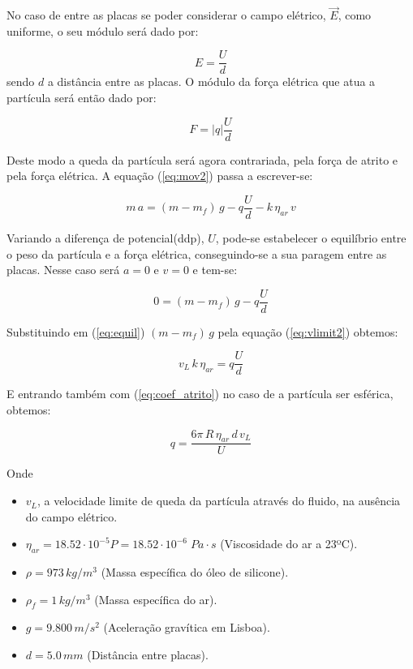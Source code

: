 \documentclass[a4paper,twoside,12pt]{article}      %
\begin{document}
No caso de entre as placas se poder considerar o campo elétrico, $\vec{E}$, como uniforme, o seu módulo será dado por:


\begin{equation*}
	E = \frac{U}{d}
\end{equation*}
sendo $d$ a distância entre as placas. O módulo da força elétrica que atua a partícula será então  dado por: 

\begin{equation*}
	F = |q| \frac{U}{d}
\end{equation*}

Deste modo a queda da partícula será agora contrariada, pela força de atrito e pela força elétrica. A equação (\ref{eq:mov2}) passa a escrever-se:

\begin{equation}
	\label{eq:mov3}
	m\,a = (m - m_f)\,g  - q \frac{U}{d} - k  \, \eta_{ar} \, v
\end{equation}

Variando a diferença de potencial(ddp), $U$, pode-se estabelecer o equilíbrio entre o peso da partícula e a força elétrica, conseguindo-se a sua paragem entre as placas. Nesse caso será $a=0$ e $v=0$ e tem-se:

\begin{equation}
	\label{eq:equil}
	0 = (m - m_f)\,g  - q \frac{U}{d} 
\end{equation}

Substituindo em (\ref{eq:equil}) $(m - m_f)\,g$   pela equação (\ref{eq:vlimit2}) obtemos:

\begin{equation*}
	v_L\, k\, \eta_{ar} = q \frac{U}{d}
\end{equation*}

E entrando também com (\ref{eq:coef_atrito}) no caso de a partícula ser esférica, obtemos:

\begin{equation}
	\label{eq:carga}
	q = \frac{6 \pi \, R \, \eta_{ar} \, d\, v_L}{U}  
\end{equation}

Onde

\begin{itemize}
\item $v_L$, a velocidade limite de queda da partícula através do fluido, na ausência do campo elétrico. 
\item $\eta_{ar} = 18.52 \cdot 10^{-5} P =  18.52 \cdot 10^{-6} \; Pa\cdot s $ (Viscosidade do ar a 23ºC).
\item $\rho = 973 \, kg/m^{3}$ (Massa específica do óleo de silicone).
\item $\rho_f = 1 \, kg/m^{3}$ (Massa específica do ar).
\item $g=9.800\, m/s^{2}$ (Aceleração gravítica em Lisboa).
\item $d=5.0\, mm$ (Distância entre placas).
\end{itemize}
\end{document}
